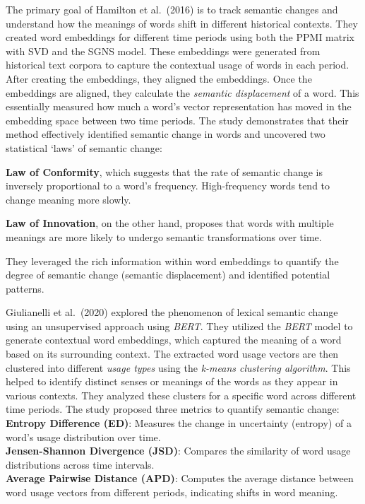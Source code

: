 The primary goal of Hamilton et al.\ (2016) is to track semantic changes and understand how the meanings of words shift in different historical contexts.
They created word embeddings for different time periods using both the PPMI matrix with SVD and the SGNS model.
These embeddings were generated from historical text corpora to capture the contextual usage of words in each period.
After creating the embeddings, they aligned the embeddings.
Once the embeddings are aligned, they calculate the \emph{semantic displacement} of a word.
This essentially measured how much a word's vector representation has moved in the embedding space between two time periods.
The study demonstrates that their method effectively identified semantic change in words and uncovered two statistical `laws' of semantic change:
\begin{packed_enumerate}
    \item \textbf{Law of Conformity}, which suggests that the rate of semantic change is inversely proportional to a word's frequency.
    High-frequency words tend to change meaning more slowly.
    \item \textbf{Law of Innovation}, on the other hand, proposes that words with multiple meanings are more likely to undergo semantic transformations over time.
\end{packed_enumerate}
They leveraged the rich information within word embeddings to quantify the degree of semantic change (semantic displacement) and identified potential patterns.

Giulianelli et al.\ (2020) explored the phenomenon of lexical semantic change using an unsupervised approach using \emph{BERT}.
They utilized the \emph{BERT} model to generate contextual word embeddings, which captured the meaning of a word based on its surrounding context.
The extracted word usage vectors are then clustered into different \emph{usage types} using the \emph{k-means clustering algorithm}.
This helped to identify distinct senses or meanings of the words as they appear in various contexts.
They analyzed these clusters for a specific word across different time periods.
The study proposed three metrics to quantify semantic change:\\
\textbf{Entropy Difference (ED)}: Measures the change in uncertainty (entropy) of a word’s usage distribution over time.\\
\textbf{Jensen-Shannon Divergence (JSD)}: Compares the similarity of word usage distributions across time intervals.\\
\textbf{Average Pairwise Distance (APD)}: Computes the average distance between word usage vectors from different periods, indicating shifts in word meaning.

